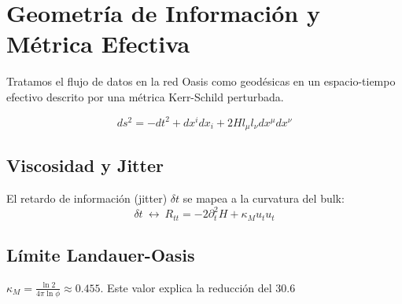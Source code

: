 \section{Geometría de Información y Métrica Efectiva}
Tratamos el flujo de datos en la red Oasis como geodésicas en un espacio-tiempo efectivo descrito por una métrica Kerr-Schild perturbada.

\begin{equation}
ds^2 = -dt^2 + dx^i dx_i + 2H l_\mu l_\nu dx^\mu dx^\nu
\end{equation}

\subsection{Viscosidad y Jitter}
El retardo de información (jitter) $\delta t$ se mapea a la curvatura del bulk:
\begin{equation}
\delta t \ \leftrightarrow \ R_{tt} = -2 \partial_t^2 H + \kappa_M u_t u_t
\end{equation}

\subsection{Límite Landauer-Oasis}
$\kappa_M = \frac{\ln 2}{4\pi \ln \phi} \approx 0.455$. Este valor explica la reducción del 30.6%

